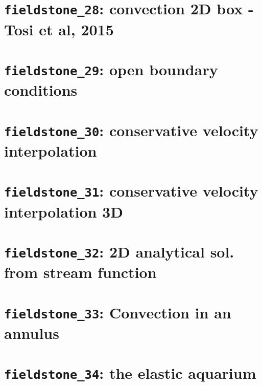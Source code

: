 \documentclass[a4paper]{article}
\begin{document}
\newpage
\section{{\tt fieldstone\_28}: convection 2D box - Tosi et al, 2015 \label{f28}}


\newpage
\section{{\tt fieldstone\_29}: open boundary conditions \label{f29}}


\newpage
\section{{\tt fieldstone\_30}: conservative velocity interpolation \label{f30}}


\newpage
\section{{\tt fieldstone\_31}: conservative velocity interpolation 3D \label{f31}}
%

\newpage
\section{{\tt fieldstone\_32}: 2D analytical sol. from stream function \label{f32}}


\newpage
\section{{\tt fieldstone\_33}: Convection in an annulus \label{f33}}


\newpage
\section{{\tt fieldstone\_34}: the elastic aquarium \label{f34}}

\end{document}

